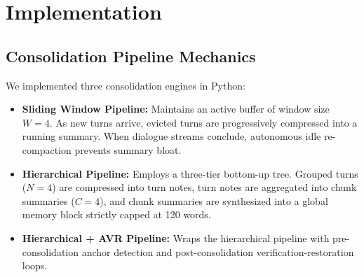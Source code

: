 \documentclass[12pt,a4paper]{report}
\begin{document}
\chapter{Implementation}

\section{Consolidation Pipeline Mechanics}
We implemented three consolidation engines in Python:
\begin{itemize}
    \item \textbf{Sliding Window Pipeline:} Maintains an active buffer of window size $W=4$. As new turns arrive, evicted turns are progressively compressed into a running summary. When dialogue streams conclude, autonomous idle re-compaction prevents summary bloat.
    \item \textbf{Hierarchical Pipeline:} Employs a three-tier bottom-up tree. Grouped turns ($N=4$) are compressed into turn notes, turn notes are aggregated into chunk summaries ($C=4$), and chunk summaries are synthesized into a global memory block strictly capped at 120 words.
    \item \textbf{Hierarchical + AVR Pipeline:} Wraps the hierarchical pipeline with pre-consolidation anchor detection and post-consolidation verification-restoration loops.
\end{itemize}
\end{document}
